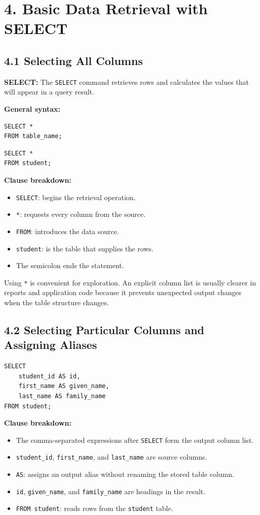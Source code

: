 \documentclass[12pt,a4paper]{article}
\newcommand{\defbox}[2]{%
  \vspace{0.2cm}
  \noindent\colorbox{boxgray}{\parbox{\dimexpr\linewidth-2\fboxsep}{%
    \textbf{#1:} #2
  }}
  \vspace{0.2cm}
}
\begin{document}
\section*{4. Basic Data Retrieval with SELECT}

\subsection*{4.1 Selecting All Columns}
\defbox{SELECT}{The \texttt{SELECT} command retrieves rows and calculates the values that will
appear in a query result.}

\noindent\textbf{General syntax:}
\begin{verbatim}
SELECT *
FROM table_name;
\end{verbatim}

\begin{verbatim}
SELECT *
FROM student;
\end{verbatim}

\noindent\textbf{Clause breakdown:}
\begin{itemize}
    \item \texttt{SELECT}: begins the retrieval operation.
    \item \texttt{*}: requests every column from the source.
    \item \texttt{FROM}: introduces the data source.
    \item \texttt{student}: is the table that supplies the rows.
    \item The semicolon ends the statement.
\end{itemize}

\noindent Using \texttt{*} is convenient for exploration. An explicit column list is usually
clearer in reports and application code because it prevents unexpected output changes when the
table structure changes.

\subsection*{4.2 Selecting Particular Columns and Assigning Aliases}
\begin{verbatim}
SELECT
    student_id AS id,
    first_name AS given_name,
    last_name AS family_name
FROM student;
\end{verbatim}

\noindent\textbf{Clause breakdown:}
\begin{itemize}
    \item The comma-separated expressions after \texttt{SELECT} form the output column list.
    \item \texttt{student\_id}, \texttt{first\_name}, and \texttt{last\_name} are source columns.
    \item \texttt{AS}: assigns an output alias without renaming the stored table column.
    \item \texttt{id}, \texttt{given\_name}, and \texttt{family\_name} are headings in the result.
    \item \texttt{FROM student}: reads rows from the \texttt{student} table.
\end{itemize}
\end{document}
